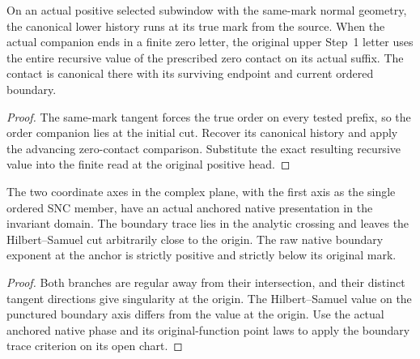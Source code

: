 \begin{theorem}
\label{hir:g1-true-mark-zero-contact-read}
\leanok
On an actual positive selected subwindow with the same-mark
normal geometry, the canonical lower history runs at its
true mark from the source. When the actual companion ends
in a finite zero letter, the original upper Step~1 letter
uses the entire recursive value of the prescribed zero contact
on its actual suffix. The contact is canonical there with
its surviving endpoint and current ordered boundary.
\end{theorem}
\begin{proof}
The same-mark tangent forces the true order on every tested
prefix, so the order companion lies at the initial cut.
Recover its canonical history and apply the advancing zero-contact
comparison. Substitute the exact resulting recursive value into
the finite read at the original positive head.
\end{proof}

\begin{theorem}
\label{hir:g1-native-crossing-submark}
\leanok
The two coordinate axes in the complex plane, with the
first axis as the single ordered SNC member, have an actual
anchored native presentation in the invariant domain.
The boundary trace lies in the analytic crossing and leaves
the Hilbert--Samuel cut arbitrarily close to the origin.
The raw native boundary exponent at the anchor is strictly
positive and strictly below its original mark.
\end{theorem}
\begin{proof}
Both branches are regular away from their intersection, and
their distinct tangent directions give singularity at the
origin. The Hilbert--Samuel value on the punctured boundary
axis differs from the value at the origin. Use the actual
anchored native phase and its original-function point laws
to apply the boundary trace criterion on its open chart.
\end{proof}

